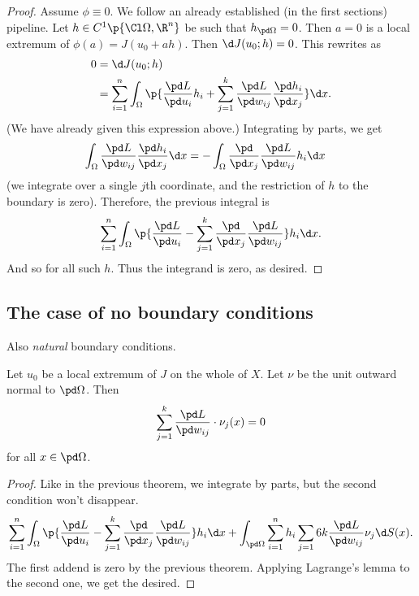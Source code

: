 \begin{proof}
  Assume $\phi \equiv 0$.
  We follow an already established (in the first sections) pipeline.
  Let $h \in C^1\p{\Cl \Omega, \R^n}$ be such that $h_{\pd \Omega} = 0$. Then $a = 0$ is a local extremum of $\phi(a) = J(u_0+ah)$.
  Then $\d J(u_0; h) = 0$.
  This rewrites as
  \begin{align*}
    0
    &= \d J(u_0; h) \\
    &= \sum_{i=1}^n \int_\Omega
    \p{ \frac{\pd L}{\pd u_i} h_i +
       \sum_{j=1}^k \frac{\pd L}{\pd w_{ij}} \frac{\pd h_i}{\pd x_j} } \d x.
  \end{align*}
  (We have already given this expression above.)
  Integrating by parts, we get
  \begin{align*}
    \int_\Omega \frac{\pd L}{\pd w_{ij}} \frac{\pd h_i}{\pd x_j} \d x
    &= - \int_\Omega \frac{\pd}{\pd x_j} \frac{\pd L}{\pd w_{ij}} h_i \d x
  \end{align*}
  (we integrate over a single $j$th coordinate, and the restriction of $h$ to the boundary is zero).
  Therefore, the previous integral is
  \begin{align*}
    \sum_{i=1}^n \int_\Omega
    \p{ \frac{\pd L}{\pd u_i} -
       \sum_{j=1}^k \frac{\pd}{\pd x_j} \frac{\pd L}{\pd w_{ij}} } h_i  \d x.
  \end{align*}
  And so for all such $h$.
  Thus the integrand is zero, as desired.
\end{proof}

\subsection{The case of no boundary conditions}

Also \emph{natural} boundary conditions.

\begin{theorem}
  Let $u_0$ be a local extremum of $J$ on the whole of $X$.
  Let $\nu$ be the unit outward normal to $\pd \Omega$.
  Then
  \begin{align*}
    \sum_{j=1}^k \frac{\pd L}{\pd w_{ij}} \cdot \nu_j(x) = 0
  \end{align*}
  for all $x \in \pd \Omega$.
\end{theorem}

\begin{proof}
  Like in the previous theorem, we integrate by parts, but the second condition won't disappear.
  \begin{align*}
    \sum_{i=1}^n \int_\Omega \p{ \frac{\pd L}{\pd u_i} - \sum_{j=1}^k \frac{\pd}{\pd x_j} \frac{\pd L}{\pd w_{ij}} } h_i \d x + \int_{\pd \Omega} \sum_{i=1}^n h_i \sum_{j=1}6k \frac{\pd L}{\pd w_{ij}} \nu_j \d S(x). 
  \end{align*}
  The first addend is zero by the previous theorem. Applying Lagrange's lemma to the second one, we get the desired.
\end{proof}

